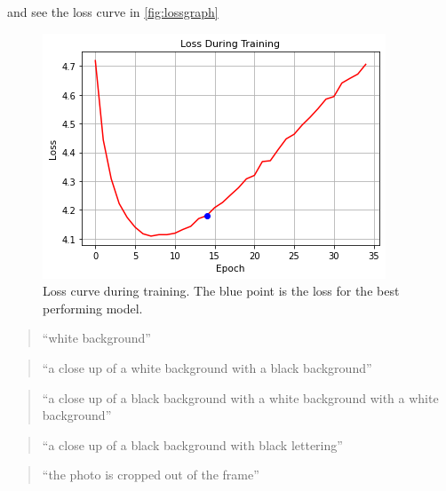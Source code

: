 \documentclass[11pt,a4paper]{article}
\begin{document}
and see the loss curve in \autoref{fig:lossgraph}


\begin{figure}[h]
  \includegraphics[width=\linewidth]{paper/images/loss_graph.png}
  \caption{Loss curve during training. The blue point is the loss for the best performing model.}
  \label{fig:lossgraph}
\end{figure}


\begin{quote}
  ``white background''
\end{quote}
\begin{quote}
  ``a close up of a white background with a black background''
\end{quote}
\begin{quote}
  ``a close up of a black background with a white background with a white background''
\end{quote}
\begin{quote}
  ``a close up of a black background with black lettering''
\end{quote}
\begin{quote}
  ``the photo is cropped out of the frame''
\end{quote}
\end{document}
